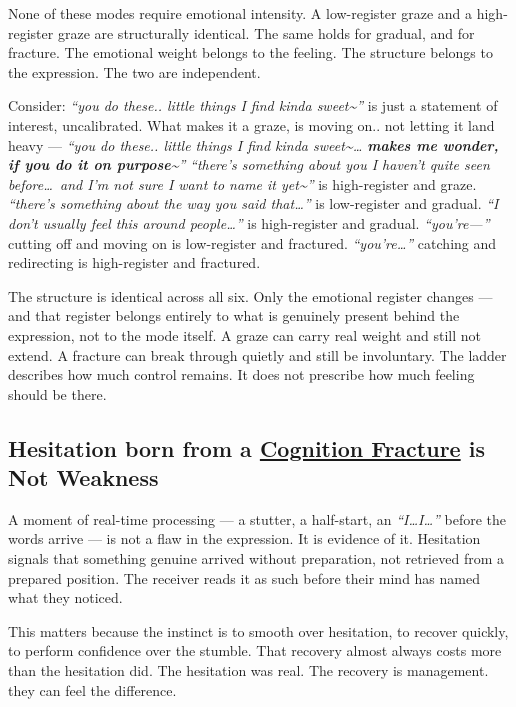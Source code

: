 None of these modes require emotional intensity. A low-register graze and a 
high-register graze are structurally identical. The same holds for gradual, 
and for fracture. The emotional weight belongs to the feeling. The structure 
belongs to the expression. The two are independent.

Consider: \textit{``you do these.. little things I find kinda sweet\textasciitilde''} 
is just a statement of interest, uncalibrated. What makes it a graze,
is moving on.. not letting it land 
heavy --- \textit{``you do these.. little things I find kinda sweet\textasciitilde\ldots 
\textbf{makes me wonder, if you do it on purpose\textasciitilde}''} 
\textit{``there's something about you I haven't quite seen before\ldots\ and I'm 
not sure I want to name it yet\textasciitilde''} is high-register and graze.
\textit{``there's something about the way you said that\ldots''} is low-register 
and gradual. \textit{``I don't usually feel this around people\ldots''} is 
high-register and gradual. \textit{``you're---''} cutting off and moving on is 
low-register and fractured. \textit{``you're\ldots''} catching and redirecting 
is high-register and fractured.

The structure is identical across all six. Only the emotional register changes 
--- and that register belongs entirely to what is genuinely present behind the 
expression, not to the mode itself. A graze can carry real weight and still not 
extend. A fracture can break through quietly and still be involuntary. The ladder 
describes how much control remains. It does not prescribe how much feeling 
should be there.

\subsection{Hesitation born from a 
\hyperref[cognition_fracture]{Cognition Fracture} is Not Weakness}\label{subsec:hesitation}

A moment of real-time processing --- a stutter, a half-start, 
an \textit{``I\ldots I\ldots''} before the words arrive --- is not a flaw in 
the expression. It is evidence of it. Hesitation signals that something 
genuine arrived without preparation, not retrieved from a prepared position. 
The receiver reads it as such before their mind has named what they noticed.

This matters because the instinct is to smooth over hesitation, 
to recover quickly, to perform confidence over the stumble. That recovery 
almost always costs more than the hesitation did. The hesitation was real. 
The recovery is management. they can feel the difference.


